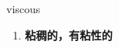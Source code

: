 
\begin{frame}
{\huge viscous}
\begin{center}
\begin{enumerate}\Large
  \item \textbf{粘稠的，有粘性的}
\end{enumerate}
\end{center}
\end{frame}
